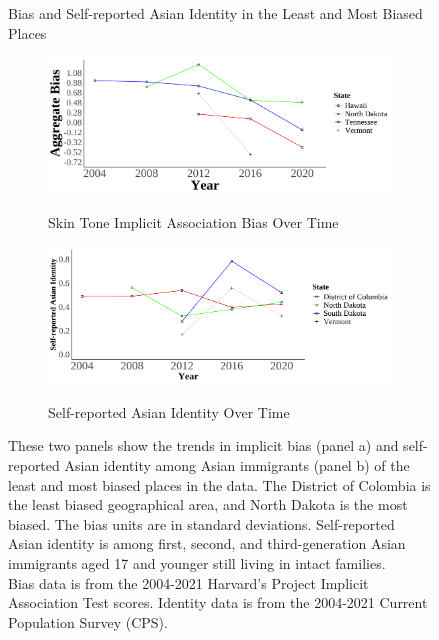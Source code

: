 \documentclass[12pt,english]{article}
\begin{document}





\begin{center}
\begin{figure}[H]
\caption{Bias and Self-reported Asian Identity in the Least and Most Biased Places}

\begin{subfigure}{.9\textwidth}
\caption{Skin Tone Implicit Association Bias Over Time}
\centering
\includegraphics[width=.9\linewidth]{figure/Bias_twostates.png} 
\label{fig:skiniat}
\end{subfigure}
\begin{subfigure}{.9\textwidth}
\caption{Self-reported Asian Identity Over Time}
\centering
\includegraphics[width=.9\linewidth]{figure/Bias_twostates-asian.png} 
\label{fig:Asian-twostates}
\end{subfigure}
\caption*{\footnotesize{These two panels show the trends in implicit bias (panel a) and self-reported Asian identity among Asian immigrants (panel b) of the least and most biased places in the data. The District of Colombia is the least biased geographical area, and North Dakota is the most biased. The bias units are in standard deviations. Self-reported Asian identity is among first, second, and third-generation Asian immigrants aged 17 and younger still living in intact families.\\
Bias data is from the 2004-2021 Harvard's Project Implicit Association Test scores. Identity data is from the 2004-2021 Current Population Survey (CPS).}}
\end{figure}
\end{center}
\end{document}
